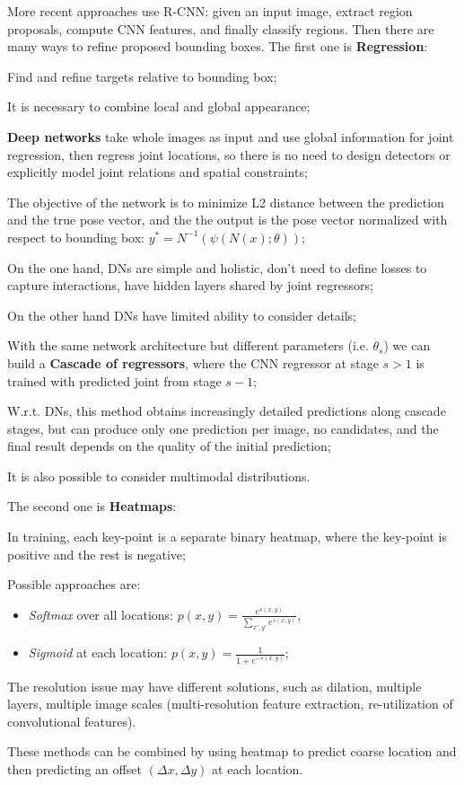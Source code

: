 More recent approaches use R-CNN: given an input image, extract region proposals, compute CNN features, and finally classify regions. Then there are many ways to refine proposed bounding boxes.
The first one is \textbf{Regression}:
\begin{myitem}
    \item Find and refine targets relative to bounding box;
    \item It is necessary to combine local and global appearance;
    \item \textbf{Deep networks} take whole images as input and use global information for joint regression, then regress joint locations, so there is no need to design detectors or explicitly model joint relations and spatial constraints;
    \item The objective of the network is to minimize L2 distance between the prediction and the true pose vector, and the the output is the pose vector normalized with respect to bounding box: $y^* = N^{-1} (\psi(N(x);\theta))$;
    \item On the one hand, DNs are simple and holistic, don't need to define losses to capture interactions, have hidden layers shared by joint regressors;
    \item On the other hand DNs have limited ability to consider details;
    \item With the same network architecture but different parameters (i.e. $\theta_s$) we can build a \textbf{Cascade of regressors}, where the CNN regressor at stage $s>1$ is trained with predicted joint from stage $s-1$;
    \item W.r.t. DNs, this method obtains increasingly detailed predictions along cascade stages, but can produce only one prediction per image, no candidates, and the final result depends on the quality of the initial prediction;
    \item It is also possible to consider multimodal distributions.
\end{myitem}
The second one is \textbf{Heatmaps}:
\begin{myitem}
    \item In training, each key-point is a separate binary heatmap, where the key-point is positive and the rest is negative;
    \item Possible approaches are:
    \begin{itemize}
        \item \textit{Softmax} over all locations: $p(x,y) = \frac{e^{s(x,y)}}{\sum_{x',y'} e^{s(x,y)}}$,
        \item \textit{Sigmoid} at each location: $p(x,y) = \frac{1}{1 + e^{-s(x,y)}}$;
    \end{itemize}
    \item The resolution issue may have different solutions, such as dilation, multiple layers, multiple image scales (multi-resolution feature extraction, re-utilization of convolutional features).
\end{myitem}
These methods can be combined by using heatmap to predict coarse location and then predicting an offset $(\Delta x, \Delta y)$ at each location.

